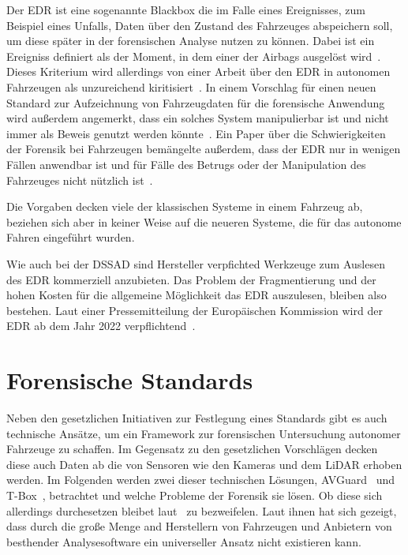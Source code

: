 \documentclass[conference,compsoc,final,a4paper]{IEEEtran}
\begin{document}
Der \ac{EDR} ist eine sogenannte Blackbox die im Falle eines Ereignisses, zum Beispiel eines Unfalls, Daten über den Zustand des Fahrzeuges abspeichern soll, um diese
später in der forensischen Analyse nutzen zu können.
Dabei ist ein Ereigniss definiert als der Moment, in dem einer der Airbags ausgelöst wird~\cite{NHTSA_2018}.
Dieses Kriterium wird allerdings von einer Arbeit über den EDR in autonomen Fahrzeugen als unzureichend kiritisiert~\cite{Boehm2020}.
In einem Vorschlag für einen neuen Standard zur Aufzeichnung von Fahrzeugdaten für die forensische Anwendung wird außerdem angemerkt,
dass ein solches System manipulierbar ist und nicht immer als Beweis genutzt werden könnte~\cite{Lee_2019}.
Ein Paper über die Schwierigkeiten der Forensik bei Fahrzeugen bemängelte außerdem, dass der \ac{EDR} nur in wenigen Fällen anwendbar ist
und für Fälle des Betrugs oder der Manipulation des Fahrzeuges nicht nützlich ist~\cite{Kopencova_2020}.

Die Vorgaben decken viele der klassischen Systeme in einem Fahrzeug ab, beziehen sich aber in keiner Weise auf die neueren Systeme, die für das autonome Fahren eingeführt wurden.

Wie auch bei der DSSAD sind Hersteller verpfichted Werkzeuge zum Auslesen des \ac{EDR} kommerziell anzubieten. Das Problem der Fragmentierung und der hohen Kosten für
die allgemeine Möglichkeit das \ac{EDR} auszulesen, bleiben also bestehen.
Laut einer Pressemitteilung der Europäischen Kommission wird der \ac{EDR} ab dem Jahr 2022 verpflichtend~\cite{EuropeanCommision_2019}.

\section{Forensische Standards}

Neben den gesetzlichen Initiativen zur Festlegung eines Standards gibt es auch technische Ansätze, um ein Framework zur forensischen
Untersuchung autonomer Fahrzeuge zu schaffen. Im Gegensatz zu den gesetzlichen Vorschlägen decken diese auch Daten ab die von Sensoren
wie den Kameras und dem \ac{LiDAR} erhoben werden.
Im Folgenden werden zwei dieser technischen Lösungen, AVGuard~\cite{Hoque_2021a} und T-Box~\cite{Lee_2019}, betrachtet und welche Probleme der Forensik sie lösen.
Ob diese sich allerdings durchesetzen bleibet laut~\cite{Kopencova_2020} zu bezweifelen.
Laut ihnen
hat sich gezeigt, dass durch die große Menge and Herstellern von Fahrzeugen und Anbietern von besthender Analysesoftware
ein universeller Ansatz nicht existieren kann.
\end{document}
